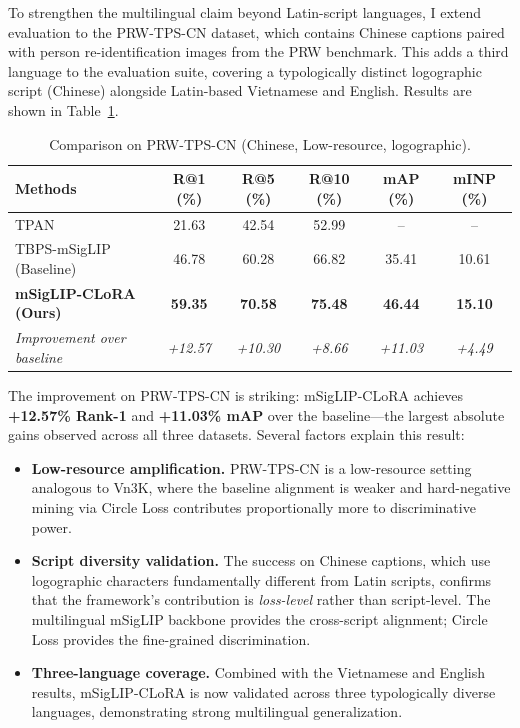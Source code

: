 \documentclass[../main.tex]{subfiles}
\begin{document}
\noindent To strengthen the multilingual claim beyond Latin-script languages, I extend evaluation to the PRW-TPS-CN dataset, which contains Chinese captions paired with person re-identification images from the PRW benchmark. This adds a third language to the evaluation suite, covering a typologically distinct logographic script (Chinese) alongside Latin-based Vietnamese and English. Results are shown in Table~\ref{tab:comparison_prw}.

\begin{table}[htbp]
\centering
\caption{Comparison on PRW-TPS-CN (Chinese, Low-resource, logographic).}
\label{tab:comparison_prw}
\renewcommand{\arraystretch}{1.3}
\begin{tabularx}{\textwidth}{Xccccc}
\toprule
\textbf{Methods} & \textbf{R@1 (\%)} & \textbf{R@5 (\%)} & \textbf{R@10 (\%)} & \textbf{mAP (\%)} & \textbf{mINP (\%)} \\
\midrule
TPAN & 21.63 & 42.54 & 52.99 & -- & -- \\
TBPS-mSigLIP (Baseline) & 46.78 & 60.28 & 66.82 & 35.41 & 10.61 \\
\textbf{mSigLIP-CLoRA (Ours)} & \textbf{59.35} & \textbf{70.58} & \textbf{75.48} & \textbf{46.44} & \textbf{15.10} \\
\midrule
\textit{Improvement over baseline} & \textit{+12.57} & \textit{+10.30} & \textit{+8.66} & \textit{+11.03} & \textit{+4.49} \\
\bottomrule
\end{tabularx}
\end{table}

\noindent The improvement on PRW-TPS-CN is striking: mSigLIP-CLoRA achieves \textbf{+12.57\% Rank-1} and \textbf{+11.03\% mAP} over the baseline---the largest absolute gains observed across all three datasets. Several factors explain this result:
\begin{itemize}
    \item \textbf{Low-resource amplification.} PRW-TPS-CN is a low-resource setting analogous to Vn3K, where the baseline alignment is weaker and hard-negative mining via Circle Loss contributes proportionally more to discriminative power.
    \item \textbf{Script diversity validation.} The success on Chinese captions, which use logographic characters fundamentally different from Latin scripts, confirms that the framework's contribution is \textit{loss-level} rather than script-level. The multilingual mSigLIP backbone provides the cross-script alignment; Circle Loss provides the fine-grained discrimination.
    \item \textbf{Three-language coverage.} Combined with the Vietnamese and English results, mSigLIP-CLoRA is now validated across three typologically diverse languages, demonstrating strong multilingual generalization.
\end{itemize}
\end{document}
